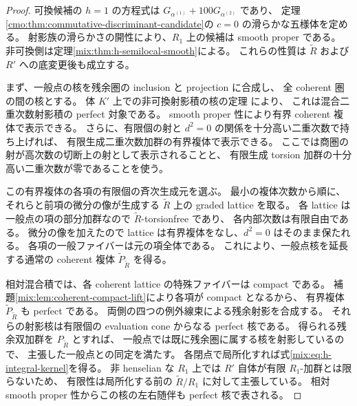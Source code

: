 \begin{proof}
可換候補の $h=1$ の方程式は
$G_{\alpha^{(1)}}+100G_{\alpha^{(2)}}$ であり、
定理\ref{cmo:thm:commutative-discriminant-candidate}の $c=0$ の滑らかな五様体を定める。
射影族の滑らかさの開性により、$R_1$ 上の候補は smooth proper である。
非可換側は定理\ref{mix:thm:h-semilocal-smooth}による。
これらの性質は $\widetilde R$ および $R'$ への底変更後も成立する。

まず、一般点の核を残余圏の inclusion と projection に合成し、
全 coherent 圏の間の核とする。
体 $K'$ 上での非可換射影積の核の定理
\cite[Theorem~4.15]{CMOBallardFarman}により、
これは混合二重次数射影積の perfect 対象である。
smooth proper 性により有界 coherent 複体で表示できる。
さらに、有限個の射と $d^2=0$ の関係を十分高い二重次数で持ち上げれば、
有限生成二重次数加群の有界複体で表示できる。
ここでは商圏の射が高次数の切断上の射として表示されることと、
有限生成 torsion 加群の十分高い二重次数が零であることを使う。

この有界複体の各項の有限個の斉次生成元を選ぶ。
最小の複体次数から順に、それらと前項の微分の像が生成する
$\widetilde R$ 上の graded lattice を取る。
各 lattice は一般点の項の部分加群なので $\widetilde R$-torsionfree であり、
各内部次数は有限自由である。
微分の像を加えたので lattice は有界複体をなし、$d^2=0$ はそのまま保たれる。
各項の一般ファイバーは元の項全体である。
これにより、一般点核を延長する通常の coherent 複体
$\widetilde P_{\widetilde R}$ を得る。

相対混合積では、各 coherent lattice の特殊ファイバーは compact である。
補題\ref{mix:lem:coherent-compact-lift}により各項が compact となるから、
有界複体 $\widetilde P_{\widetilde R}$ も perfect である。
両側の四つの例外線束による残余射影を合成する。
それらの射影核は有限個の evaluation cone からなる perfect 核である。
得られる残余双加群を $P_{\widetilde R}$ とすれば、
一般点では既に残余圏に属する核を射影しているので、
主張した一般点との同定を満たす。
各閉点で局所化すれば式\eqref{mix:eq:h-integral-kernel}を得る。
非 henselian な $R_1$ 上では $R'$ 自体が有限 $R_1$-加群とは限らないため、
有限性は局所化する前の $\widetilde R/R_1$ に対して主張している。
相対 smooth proper 性からこの核の左右随伴も perfect 核で表される。
\end{proof}

